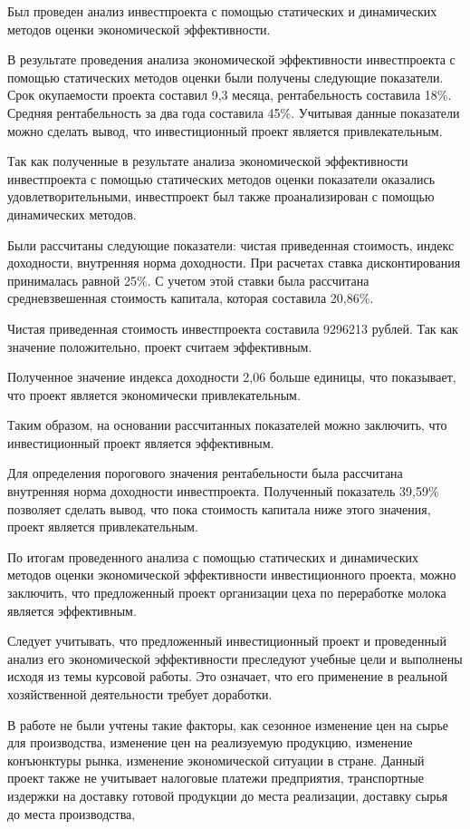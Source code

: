 Был проведен анализ инвестпроекта с помощью статических и динамических методов оценки экономической эффективности.

В результате проведения анализа экономической эффективности инвестпроекта с помощью статических методов оценки были получены следующие показатели. Срок окупаемости проекта составил 9,3 месяца, рентабельность составила 18\%. Средняя рентабельность за два года составила 45\%. Учитывая данные показатели можно сделать вывод, что инвестиционный проект является привлекательным.

Так как полученные в результате анализа экономической эффективности инвестпроекта с помощью статических методов оценки показатели оказались удовлетворительными, инвестпроект был также проанализирован с помощью динамических методов.

Были рассчитаны следующие показатели: чистая приведенная стоимость, индекс доходности, внутренняя норма доходности. При расчетах ставка дисконтирования принималась равной 25\%. С учетом этой ставки была рассчитана средневзвешенная стоимость капитала, которая составила 20,86\%.

Чистая приведенная стоимость инвестпроекта составила 9296213 рублей. Так как значение положительно, проект считаем эффективным.

Полученное значение индекса доходности 2,06 больше единицы, что показывает, что проект является экономически привлекательным.

Таким образом, на основании рассчитанных показателей можно заключить, что инвестиционный проект является эффективным.

Для определения порогового значения рентабельности была рассчитана внутренняя норма доходности инвестпроекта. Полученный показатель 39,59\% позволяет сделать вывод, что пока стоимость капитала ниже этого значения, проект является привлекательным.

По итогам проведенного анализа с помощью статических и динамических методов оценки экономической эффективности инвестиционного проекта, можно заключить, что предложенный проект организации цеха по переработке молока является эффективным.

Следует учитывать, что предложенный инвестиционный проект и проведенный анализ его экономической эффективности преследуют учебные цели и выполнены исходя из темы курсовой работы. Это означает, что его применение в реальной хозяйственной деятельности требует доработки.

В работе не были учтены такие факторы, как сезонное изменение цен на сырье для производства, изменение цен на реализуемую продукцию, изменение конъюнктуры рынка, изменение экономической ситуации в стране. Данный проект также не учитывает налоговые платежи предприятия, транспортные издержки на доставку готовой продукции до места реализации, доставку сырья до места производства,


















